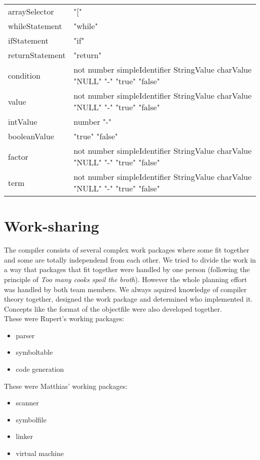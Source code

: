\begin{tabularx}{\linewidth}{YY}
arraySelector & "[" \\
whileStatement & "while" \\
ifStatement & "if" \\
returnStatement & "return" \\
condition & not number simpleIdentifier StringValue charValue "NULL" "-" "true" "false" \\
value & not number simpleIdentifier StringValue charValue "NULL" "-" "true" "false" \\
intValue & number "-" \\
booleanValue & "true" "false" \\
factor & not number simpleIdentifier StringValue charValue "NULL" "-" "true" "false" \\
term & not number simpleIdentifier StringValue charValue "NULL" "-" "true" "false" \\
\end{tabularx}



\section{Work-sharing}
\label{appendix:work-sharing}
The compiler consists of several complex work packages where some fit together
and some are totally independend from each other. We tried to divide the work in
a way that packages that fit together were handled by one person (following the
principle of \emph{Too many cooks spoil the broth}). 
However the whole planning effort was handled by both team members. We always
aquired knowledge of compiler theory together, designed the work package and
determined who implemented it. Concepts like the format of the objectfile were
also developed together. \\
These were Rupert's working packages:
\begin{itemize}
  \item parser
  \item symboltable
  \item code generation
\end{itemize}
These were Matthias' working packages:
\begin{itemize}
  \item scanner
  \item symbolfile
  \item linker
  \item virtual machine
\end{itemize}

